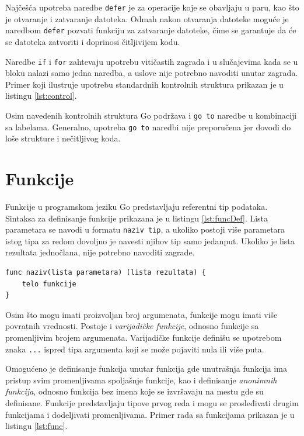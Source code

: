 \documentclass[12pt,oneside]{memoir}
\begin{document}
Najčešća upotreba naredbe \texttt{defer} je za operacije koje se obavljaju u paru, kao što je otvaranje i zatvaranje datoteka. Odmah nakon otvaranja datoteke moguće je naredbom \texttt{defer} pozvati funkciju za zatvaranje datoteke, čime se garantuje da će se datoteka zatvoriti i doprinosi čitljivijem kodu. 

Naredbe \texttt{if} i \texttt{for} zahtevaju upotrebu vitičastih zagrada i u slučajevima kada se u bloku nalazi samo jedna naredba, a uslove nije potrebno navoditi unutar zagrada. Primer koji ilustruje upotrebu standardnih kontrolnih struktura prikazan je u listingu \ref{lst:control}. 

Osim navedenih kontrolnih struktura Go podržava i \texttt{go to} naredbe u kombinaciji sa labelama. Generalno, upotreba \texttt{go to} naredbi nije preporučena jer dovodi do loše strukture i nečitljivog koda.


\section{Funkcije} \label{func}

Funkcije u programskom jeziku Go predstavljaju referentni tip podataka. Sintaksa za definisanje funkcije prikazana je u listingu \ref{lst:funcDef}. Lista parametara se navodi u formatu \texttt{naziv tip}, a ukoliko postoji više parametara istog tipa za redom dovoljno je navesti njihov tip samo jedanput. Ukoliko je lista rezultata jednočlana, nije potrebno navoditi zagrade.

\begin{center}
\begin{lstlisting}[caption=Sintaksa za definisanje funkcije, label={lst:funcDef},  backgroundcolor=\color{background}]
func naziv(lista parametara) (lista rezultata) {
	telo funkcije 
} 
\end{lstlisting}
\end{center}

Osim što mogu imati proizvoljan broj argumenata, funkcije mogu imati više povratnih vrednosti. Postoje i \textit{varijadičke funkcije}, odnosno funkcije sa promenljivim brojem argumenata. Varijadičke funkcije definišu se upotrebom znaka \texttt{...} ispred tipa argumenta koji se može pojaviti nula ili više puta. 

Omogućeno je definisanje funkcija unutar funkcija gde unutrašnja funkcija ima pristup svim promenljivama spoljašnje funkcije, kao i  definisanje \textit{anonimnih funkcija}, odnosno funkcija bez imena koje se izvršavaju na mestu gde su definisane. Funkcije predstavljaju tipove prvog reda i mogu se prosleđivati drugim funkcijama i dodeljivati promenljivama. Primer rada sa funkcijama prikazan je u listingu \ref{lst:func}.
\end{document}
